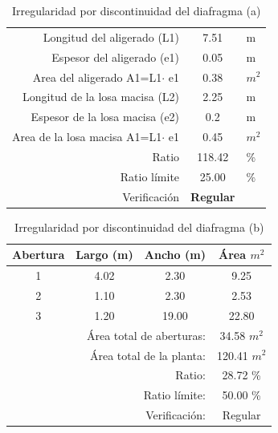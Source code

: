 \documentclass{article}%
\begin{document}
\begin{table}[H]%
\centering%
\caption{Irregularidad por discontinuidad del diafragma (a)}%
\begin{tabular}{llcr}%
\cline{1-3}%
\multicolumn{2}{r}{Longitud del aligerado (L1)} & 7.51 & \multicolumn{1}{l}{m} \\%
\multicolumn{2}{r}{Espesor del aligerado (e1)} & 0.05 & \multicolumn{1}{l}{m} \\%
\multicolumn{2}{r}{Area del aligerado A1=L1$\cdot$ e1} & 0.38 & \multicolumn{1}{l}{$m^2$} \\%
\multicolumn{2}{r}{Longitud de la losa macisa (L2)} & 2.25 & \multicolumn{1}{l}{m} \\%
\multicolumn{2}{r}{Espesor de la losa macisa (e2)} & 0.2 & \multicolumn{1}{l}{m} \\%
\multicolumn{2}{r}{Area de la losa macisa A1=L1$\cdot$ e1} & 0.45 & \multicolumn{1}{l}{$m^2$} \\%
\multicolumn{2}{r}{Ratio} & 118.42 & \multicolumn{1}{l}{\%} \\%
\multicolumn{2}{r}{Ratio límite} & 25.00 & \multicolumn{1}{l}{\%} \\%
\multicolumn{2}{r}{Verificación} & \textcolor[rgb]{ .267,  .447,  .769}{\textbf{Regular}} & \multicolumn{1}{l}{} \\%
\cline{1-3}%
\end{tabular}%
\end{table}

%
\vspace{-15pt}%


\begin{table}[H]%
\centering%
\caption{Irregularidad por discontinuidad del diafragma (b)}%
\begin{tabular}{cccc}%
\hline%
\textbf{Abertura}&\textbf{Largo (m)}&\textbf{Ancho (m)}&\textbf{Área $m^2$}\\%
\hline%
1&4.02&2.30&9.25\\%
\hline%
2&1.10&2.30&2.53\\%
\hline%
3&1.20&19.00&22.80\\%
\hline%
&\multicolumn{2}{r}{Área total de aberturas:}&34.58 $m^2$\\%
&\multicolumn{2}{r}{Área total de la planta:}&120.41 $m^2$\\%
&\multicolumn{2}{r}{Ratio:}&28.72 \%\\%
&\multicolumn{2}{r}{Ratio límite:}&50.00 \%\\%
&\multicolumn{2}{r}{Verificación:}&\textcolor[rgb]{ .267,  .447,  .769} {Regular}\\%
\end{tabular}%
\end{table}
\end{document}
